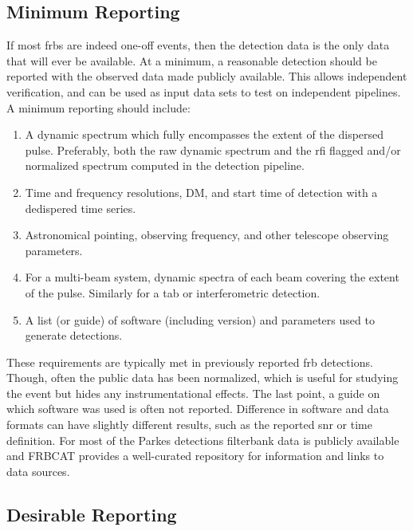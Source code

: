 \documentclass[a4paper,fleqn,usenatbib]{mnras}
\begin{document}
\subsection{Minimum Reporting}

If most \glspl{frb} are indeed one-off events, then the detection data is the
only data that will ever be available.  At a minimum, a reasonable detection
should be reported with the observed data made publicly available.  This allows
independent verification, and can be used as input data sets to test on
independent pipelines.  A minimum reporting should include:

\begin{enumerate}
    \item A dynamic spectrum which fully encompasses the extent of the dispersed
    pulse. Preferably, both the raw dynamic spectrum and the \gls{rfi} flagged
    and/or normalized spectrum computed in the detection pipeline.
    \item Time and frequency resolutions, DM, and start time of detection with a
    dedispered time series.
    \item Astronomical pointing, observing frequency, and other telescope
    observing parameters.
    \item For a multi-beam system, dynamic spectra of each beam covering the
    extent of the pulse. Similarly for a \gls{tab} or interferometric detection.
    \item A list (or guide) of software (including version) and parameters used
    to generate detections.
\end{enumerate}


These requirements are typically met in previously reported \gls{frb}
detections. Though, often the public data has been normalized, which is useful
for studying the event but hides any instrumentational effects.  The last point,
a guide on which software was used is often not reported.  Difference in
software and data formats can have slightly different results, such as the
reported \gls{snr} or time definition. For most of the Parkes detections
filterbank data is publicly available and FRBCAT \citep{2016PASA...33...45P}
provides a well-curated repository for information and links to data sources.

\subsection{Desirable Reporting}
\end{document}
